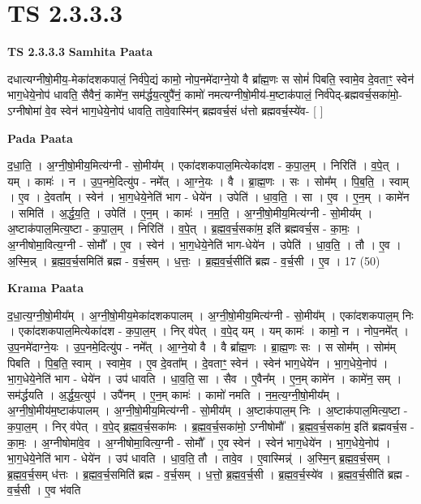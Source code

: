 \documentclass[17pt]{extarticle}
\begin{document}
\section*{ TS 2.3.3.3 }

\textbf{TS 2.3.3.3 } \newline
\textbf{Samhita Paata} \newline

दधात्यग्नीषो॒मीय॒-मेका॑दशकपालं॒ निर्व॑पे॒द्यं कामो॒ नोप॒नमे॑दाग्ने॒यो वै ब्रा᳚ह्म॒णः स सोमं॑ पिबति॒ स्वामे॒व दे॒वताꣳ॒॒ स्वेन॑ भाग॒धेये॒नोप॑ धावति॒ सैवैनं॒ कामे॑न॒ सम॑र्द्धय॒त्युपै॑नं॒ कामो॑ नमत्यग्नीषो॒मीय॑-म॒ष्टाक॑पालं॒ निर्व॑पेद्-ब्रह्मवर्च॒सका॑मो॒-ऽग्नीषोमा॑ वे॒व स्वेन॑ भाग॒धेये॒नोप॑ धावति॒ तावे॒वास्मि॑न् ब्रह्मवर्च॒सं ध॑त्तो ब्रह्मवर्च॒स्ये॑व- [  ] \newline

\textbf{Pada Paata} \newline

द॒धा॒ति॒ । अ॒ग्नी॒षो॒मीय॒मित्य॑ग्नी - सो॒मीय᳚म् । एका॑दशकपाल॒मित्येका॑दश - क॒पा॒ल॒म् । निरिति॑ । व॒पे॒त् । यम् । कामः॑ । न । उ॒प॒नमे॒दित्यु॑प - नमे᳚त् । आ॒ग्ने॒यः । वै । ब्रा॒ह्म॒णः । सः । सोम᳚म् । पि॒ब॒ति॒ । स्वाम् । ए॒व । दे॒वता᳚म् । स्वेन॑ । भा॒ग॒धेये॒नेति॑ भाग - धेये॑न । उपेति॑ । धा॒व॒ति॒ । सा । ए॒व । ए॒न॒म् । कामे॑न । समिति॑ । अ॒र्द्ध॒य॒ति॒ । उपेति॑ । ए॒न॒म् । कामः॑ । न॒म॒ति॒ । अ॒ग्नी॒षो॒मीय॒मित्य॑ग्नी - सो॒मीय᳚म् । अ॒ष्टाक॑पाल॒मित्य॒ष्टा - क॒पा॒ल॒म् । निरिति॑ । व॒पे॒त् । ब्र॒ह्म॒व॒र्च॒सका॑म॒ इति॑ ब्रह्मवर्च॒स - का॒मः॒ । अ॒ग्नीषोमा॒वित्य॒ग्नी - सोमौ᳚ । ए॒व । स्वेन॑ । भा॒ग॒धेये॒नेति॑ भाग-धेये॑न । उपेति॑ । धा॒व॒ति॒ । तौ । ए॒व । अ॒स्मि॒न्न् । ब्र॒ह्म॒व॒र्च॒समिति॑ ब्रह्म - व॒र्च॒सम् । ध॒त्तः॒ । ब्र॒ह्म॒व॒र्च॒सीति॑ ब्रह्म - व॒र्च॒सी । ए॒व । 17 (50)  \newline


\textbf{Krama Paata} \newline

द॒धा॒त्य॒ग्नी॒षो॒मीय᳚म् । अ॒ग्नी॒षो॒मीय॒मेका॑दशकपालम् । अ॒ग्नी॒षो॒मीय॒मित्य॑ग्नी - सो॒मीय᳚म् । एका॑दशकपाल॒म् निः । एका॑दशकपाल॒मित्येका॑दश - क॒पा॒ल॒म् । निर् व॑पेत् । व॒पे॒द् यम् । यम् कामः॑ । कामो॒ न । नोप॒नमे᳚त् । उ॒प॒नमे॑दाग्ने॒यः । उ॒प॒नमे॒दित्यु॑प - नमे᳚त् । आ॒ग्ने॒यो वै । वै ब्रा᳚ह्म॒णः । ब्रा॒ह्म॒णः सः । स सोम᳚म् । सोम॑म् पिबति । पि॒ब॒ति॒ स्वाम् । स्वामे॒व । ए॒व दे॒वता᳚म् । दे॒वताꣳ॒॒ स्वेन॑ । स्वेन॑ भाग॒धेये॑न । भा॒ग॒धेये॒नोप॑ । भा॒ग॒धेये॒नेति॑ भाग - धेये॑न । उप॑ धावति । धा॒व॒ति॒ सा । सैव । ए॒वैन᳚म् । ए॒न॒म् कामे॑न । कामे॑न॒ सम् । सम॑र्द्धयति । अ॒र्द्ध॒य॒त्युप॑ । उपै॑नम् । ए॒न॒म् कामः॑ । कामो॑ नमति । न॒म॒त्य॒ग्नी॒षो॒मीय᳚म् । अ॒ग्नी॒षो॒मीय॑म॒ष्टाक॑पालम् । अ॒ग्नी॒षो॒मीय॒मित्य॑ग्नी - सो॒मीय᳚म् । अ॒ष्टाक॑पाल॒म् निः । अ॒ष्टाक॑पाल॒मित्य॒ष्टा - क॒पा॒ल॒म् । निर् व॑पेत् । व॒पे॒द् ब्र॒ह्म॒व॒र्च॒सका॑मः । ब्र॒ह्म॒व॒र्च॒सका॑मो॒ ऽग्नीषोमौ᳚ । ब्र॒ह्म॒व॒र्च॒सका॑म॒ इति॑ ब्रह्मवर्च॒स - का॒मः॒ । अ॒ग्नीषोमा॑वे॒व । अ॒ग्नीषोमा॒वित्य॒ग्नी - सोमौ᳚ । ए॒व स्वेन॑ । स्वेन॑ भाग॒धेये॑न । भा॒ग॒धेये॒नोप॑ । भा॒ग॒धेये॒नेति॑ भाग - धेये॑न । उप॑ धावति । धा॒व॒ति॒ तौ । तावे॒व । ए॒वास्मिन्न्॑ । अ॒स्मि॒न् ब्र॒ह्म॒व॒र्च॒सम् । ब्र॒ह्म॒व॒र्च॒सम् ध॑त्तः । ब्र॒ह्म॒व॒र्च॒समिति॑ ब्रह्म - व॒र्च॒सम् । ध॒त्तो॒ ब्र॒ह्म॒व॒र्च॒सी । ब्र॒ह्म॒व॒र्च॒स्ये॑व । ब्र॒ह्म॒व॒र्च॒सीति॑ ब्रह्म - व॒र्च॒सी । ए॒व भ॑वति \newline
\end{document}
